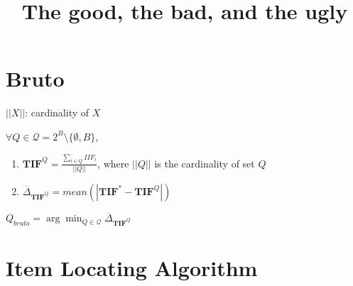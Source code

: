 \documentclass[12pt, a4paper, titilepage]{article}
\title{The good, the bad, and the ugly}
\author{}
\begin{document}
\maketitle

\begin{abstract}

\end{abstract}

\newpage

\doublespacing


\section{Bruto}




$||X||$: cardinality of $X$



$\forall Q \in\mathcal{Q} = 2^B \setminus \{\emptyset, B\}$, 

\begin{enumerate}
	\item $\mathbf{TIF}^{Q} =  \frac{\sum_{i \in Q} IIF_i}{||Q||}$, where $||Q||$ is the cardinality of set $Q$
	\item $\overline{\Delta}_{\mathbf{TIF}^{Q}} =  \mathit{mean}(|\mathbf{TIF}^* - \mathbf{TIF}^{Q}|)$ %
	
\end{enumerate}


$Q_{bruto} = \arg \min_{Q \in \mathcal{Q}} \overline{\Delta}_{\mathbf{TIF}^{Q}}$


\section{Item Locating Algorithm}

\end{document}

